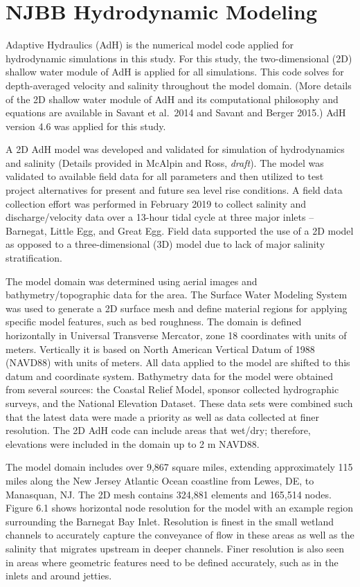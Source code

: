 \documentclass[
]{book}
\begin{document}
\hypertarget{njbb-hydrodynamic-modeling}{%
\section{NJBB Hydrodynamic Modeling}\label{njbb-hydrodynamic-modeling}}

Adaptive Hydraulics (AdH) is the numerical model code applied for hydrodynamic simulations in this study. For this study, the two-dimensional (2D) shallow water module of AdH is applied for all simulations. This code solves for depth-averaged velocity and salinity throughout the model domain. (More details of the 2D shallow water module of AdH and its computational philosophy and equations are available in Savant et al.~2014 and Savant and Berger 2015.) AdH version 4.6 was applied for this study.

A 2D AdH model was developed and validated for simulation of hydrodynamics and salinity (Details provided in McAlpin and Ross, \emph{draft}). The model was validated to available field data for all parameters and then utilized to test project alternatives for present and future sea level rise conditions. A field data collection effort was performed in February 2019 to collect salinity and discharge/velocity data over a 13-hour tidal cycle at three major inlets -- Barnegat, Little Egg, and Great Egg. Field data supported the use of a 2D model as opposed to a three-dimensional (3D) model due to lack of major salinity stratification.

The model domain was determined using aerial images and bathymetry/topographic data for the area. The Surface Water Modeling System was used to generate a 2D surface mesh and define material regions for applying specific model features, such as bed roughness. The domain is defined horizontally in Universal Transverse Mercator, zone 18 coordinates with units of meters. Vertically it is based on North American Vertical Datum of 1988 (NAVD88) with units of meters. All data applied to the model are shifted to this datum and coordinate system. Bathymetry data for the model were obtained from several sources: the Coastal Relief Model, sponsor collected hydrographic surveys, and the National Elevation Dataset. These data sets were combined such that the latest data were made a priority as well as data collected at finer resolution. The 2D AdH code can include areas that wet/dry; therefore, elevations were included in the domain up to 2 m NAVD88.

The model domain includes over 9,867 square miles, extending approximately 115 miles along the New Jersey Atlantic Ocean coastline from Lewes, DE, to Manasquan, NJ. The 2D mesh contains 324,881 elements and 165,514 nodes. Figure 6.1 shows horizontal node resolution for the model with an example region surrounding the Barnegat Bay Inlet. Resolution is finest in the small wetland channels to accurately capture the conveyance of flow in these areas as well as the salinity that migrates upstream in deeper channels. Finer resolution is also seen in areas where geometric features need to be defined accurately, such as in the inlets and around jetties.
\end{document}
